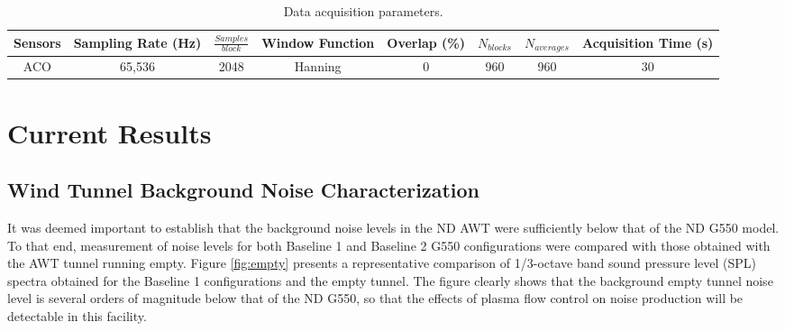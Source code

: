 \begin{table}
 \setlength{\capwidth}{0.8\textwidth}
\begin{center}
\caption{Data acquisition parameters.}
\label{tab:data}
\begin{tabular}{cccccccc}\toprule
\parbox{0.1\linewidth}{\centering Sensors} & 
\parbox{0.12\linewidth}{\centering Sampling Rate (Hz)} & 
\parbox{0.1\linewidth}{\centering $\frac{Samples} {block}$} & 
\parbox{0.11\linewidth}{\centering Window Function} & 
\parbox{0.1\linewidth}{\centering Overlap (\%)} & 
\parbox{0.1\linewidth}{\centering $N_{blocks}$} & 
\parbox{0.1\linewidth}{\centering $N_{averages}$} & 
\parbox{0.11\linewidth}{\centering Acquisition Time (s)} \\ \midrule
ACO & 65,536 & 2048 & Hanning & 0 & 960 & 960 & 30 \\ \bottomrule
\end{tabular}
\end{center}
\end{table}

\section{Current Results}

\subsection{Wind Tunnel Background Noise Characterization}
It was deemed important to establish that the background noise levels in the ND AWT were sufficiently below that of the ND G550 model. To that end, measurement of noise levels for both Baseline 1 and Baseline 2 G550 configurations were compared with those obtained with the AWT tunnel running empty. Figure \ref{fig:empty} presents a representative comparison of 1/3-octave band sound pressure level (SPL) spectra obtained for the Baseline 1 configurations and the empty tunnel. The figure clearly shows that the background empty tunnel noise level is several orders of magnitude below that of the ND G550, so that the effects of plasma flow control on noise production will be detectable in this facility.

